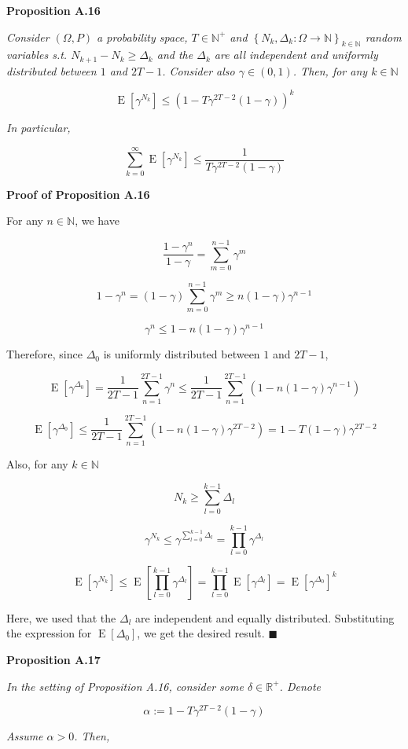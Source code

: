 \documentclass[a4paper]{article}
\newcommand{\Co}[1]{}
\newcommand{\AP}[1]{\left(#1\right)}
\newcommand{\AB}[1]{\left[#1\right]}
\newcommand{\AC}[1]{\left\{#1\right\}}
\newcommand{\E}[1]{\operatorname{E}\AB{#1}}
\newcommand{\Nats}{\mathbb{N}}
\newcommand{\Reals}{\mathbb{R}}
\begin{document}
\textbf{Proposition A.16}\Co{b}

\textit{Consider $(\Omega,P)$ a probability space, $T\in\Nats^+$ and $\AC{N_k,\Delta_k:\Omega\rightarrow\Nats}_{k\in\Nats}$ random variables s.t. $N_{k+1}-N_k\geq\Delta_k$ and the $\Delta_k$ are all independent and uniformly distributed between $1$ and $2T-1$. Consider also $\gamma\in(0,1)$. Then, for any $k\in\Nats$}\Co{i}

$$\E{\gamma^{N_k}}\leq\AP{1-T\gamma^{2T-2}(1-\gamma)}^k$$

\textit{In particular,}\Co{i}

$$\sum_{k=0}^\infty\E{\gamma^{N_k}}\leq\frac{1}{T\gamma^{2T-2}(1-\gamma)}$$

\textbf{Proof of Proposition A.16}\Co{b}

For any $n\in\Nats$, we have

$$\frac{1-\gamma^n}{1-\gamma}=\sum_{m=0}^{n-1}\gamma^m$$

$$1-\gamma^n=(1-\gamma)\sum_{m=0}^{n-1}\gamma^m\geq n(1-\gamma)\gamma^{n-1}$$

$$\gamma^n\leq1-n(1-\gamma)\gamma^{n-1}$$

Therefore, since $\Delta_0$ is uniformly distributed between $1$ and $2T-1$,

$$\E{\gamma^{\Delta_0}}=\frac{1}{2T-1}\sum_{n=1}^{2T-1}\gamma^n\leq\frac{1}{2T-1}\sum_{n=1}^{2T-1}\AP{1-n(1-\gamma)\gamma^{n-1}}$$

$$\E{\gamma^{\Delta_0}}\leq\frac{1}{2T-1}\sum_{n=1}^{2T-1}\AP{1-n(1-\gamma)\gamma^{2T-2}}=1-T(1-\gamma)\gamma^{2T-2}$$

Also, for any $k\in\Nats$

$$N_k\geq\sum_{l=0}^{k-1}\Delta_l$$

$$\gamma^{N_k}\leq\gamma^{\sum_{l=0}^{k-1}\Delta_l}=\prod_{l=0}^{k-1}\gamma^{\Delta_l}$$

$$\E{\gamma^{N_k}}\leq\E{\prod_{l=0}^{k-1}\gamma^{\Delta_l}}=\prod_{l=0}^{k-1}\E{\gamma^{\Delta_l}}=\E{\gamma^{\Delta_0}}^k$$

Here, we used that the $\Delta_l$ are independent and equally distributed. Substituting the expression for $\E{\Delta_0}$, we get the desired result. $\blacksquare$

\textbf{Proposition A.17}\Co{b}

\textit{In the setting of Proposition A.16, consider some $\delta\in\Reals^+$. Denote}\Co{i}

$$\alpha:=1-T\gamma^{2T-2}(1-\gamma)$$

\textit{Assume $\alpha>0$. Then,}\Co{i}
\end{document}
